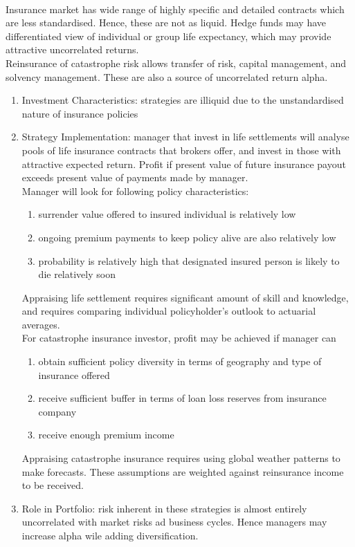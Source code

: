\begin{remark} \\
Insurance market has wide range of highly specific and detailed contracts which are less standardised. Hence, these are not as liquid. Hedge funds may have differentiated view of individual or group life expectancy, which may provide attractive uncorrelated returns.\\
Reinsurance of catastrophe risk allows transfer of risk, capital management, and solvency management. These are also a source of uncorrelated return alpha.
\begin{enumerate}[label=\roman*.]
\setlength{\itemsep}{0pt}
\item Investment Characteristics: strategies are illiquid due to the unstandardised nature of insurance policies
\item Strategy Implementation: manager that invest in life settlements will analyse pools of life insurance contracts that brokers offer, and invest in those with attractive expected return. Profit if present value of future insurance payout exceeds present value of payments made by manager.\\
Manager will look for following policy characteristics:
\begin{enumerate}[label=\arabic*.]
\setlength{\itemsep}{0pt}
\item surrender value offered to insured individual is relatively low
\item ongoing premium payments to keep policy alive are also relatively low
\item probability is relatively high that designated insured person is likely to die relatively soon
\end{enumerate}
Appraising life settlement requires significant amount of skill and knowledge, and requires comparing individual policyholder's outlook to actuarial averages.\\
For catastrophe insurance investor, profit may be achieved if manager can
\begin{enumerate}[label=\arabic*.]
\setlength{\itemsep}{0pt}
\item obtain sufficient policy diversity in terms of geography and type of insurance offered
\item receive sufficient buffer in terms of loan loss reserves from insurance company
\item receive enough premium income
\end{enumerate}
Appraising catastrophe insurance requires using global weather patterns to make forecasts. These assumptions are weighted against reinsurance income to be received.
\item Role in Portfolio: risk inherent in these strategies is almost entirely uncorrelated with market risks ad business cycles. Hence managers may increase alpha wile adding diversification.
\end{enumerate}
\end{remark}

